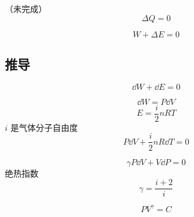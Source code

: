 

（未完成）
\begin{equation}
\Delta Q = 0
\end{equation}

\begin{equation}
W + \Delta E = 0
\end{equation}

\subsection{推导}
\begin{equation}
\dd{W} + \dd{E} = 0
\end{equation}

\begin{equation}
\dd{W} = P\dd{V}
\end{equation}
\begin{equation}
E = \frac{i}{2}n RT
\end{equation}
$i$ 是气体分子自由度
\begin{equation}
P\dd{V} + \frac{i}{2}nR\dd{T} = 0
\end{equation}

\begin{equation}
\gamma P\dd{V} + V \dd{P} = 0
\end{equation}
绝热指数
\begin{equation}
\gamma = \frac{i+2}{i}
\end{equation}

\begin{equation}
P V^\gamma = C
\end{equation}
